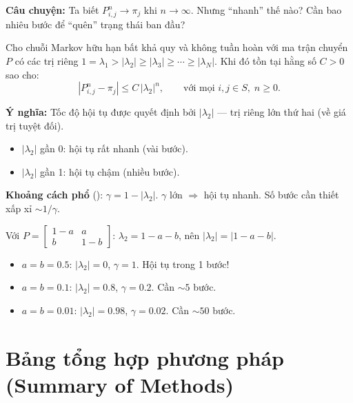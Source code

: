 \textbf{Câu chuyện:} Ta biết $P^n_{i,j} \to \pi_j$ khi $n \to \infty$.
Nhưng ``nhanh'' thế nào? Cần bao nhiêu bước để ``quên'' trạng thái ban đầu?

\begin{dinhly}
\label{thm:convergence-rate}
Cho chuỗi Markov hữu hạn bất khả quy và không tuần hoàn với ma trận chuyển $P$ có
các trị riêng $1 = \lambda_1 > |\lambda_2| \geq |\lambda_3| \geq \cdots \geq |\lambda_N|$.
Khi đó tồn tại hằng số $C > 0$ sao cho:
\begin{equation}\label{eq:convergence-rate}
  |P^n_{i,j} - \pi_j| \leq C\, |\lambda_2|^n, \qquad \text{với mọi } i, j \in S, \; n \geq 0.
\end{equation}
\end{dinhly}

\textbf{Ý nghĩa:} Tốc độ hội tụ được quyết định bởi $|\lambda_2|$ --- trị riêng lớn thứ hai (về giá trị tuyệt đối).
\begin{itemize}[nosep]
  \item $|\lambda_2|$ gần 0: hội tụ rất nhanh (vài bước).
  \item $|\lambda_2|$ gần 1: hội tụ chậm (nhiều bước).
\end{itemize}

\textbf{Khoảng cách phổ} (): $\gamma = 1 - |\lambda_2|$.
$\gamma$ lớn $\Rightarrow$ hội tụ nhanh. Số bước cần thiết xấp xỉ $\sim 1/\gamma$.

\begin{example}
Với $P = \begin{bmatrix} 1-a & a \\ b & 1-b \end{bmatrix}$:
$\lambda_2 = 1 - a - b$, nên $|\lambda_2| = |1-a-b|$.

\begin{itemize}[nosep]
  \item $a = b = 0.5$: $|\lambda_2| = 0$, $\gamma = 1$. Hội tụ trong 1 bước!
  \item $a = b = 0.1$: $|\lambda_2| = 0.8$, $\gamma = 0.2$. Cần $\sim 5$ bước.
  \item $a = b = 0.01$: $|\lambda_2| = 0.98$, $\gamma = 0.02$. Cần $\sim 50$ bước.
\end{itemize}
\end{example}

\section{Bảng tổng hợp phương pháp (Summary of Methods)}
\label{sec:summary-methods}


